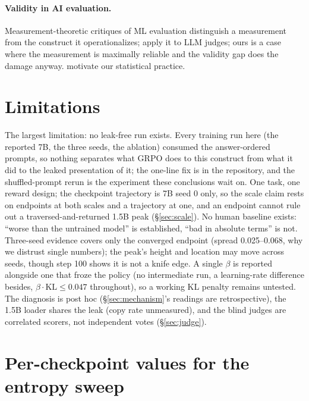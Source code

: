 \documentclass{article}
\begin{document}
\paragraph{Validity in AI evaluation.} Measurement-theoretic critiques of
ML evaluation \citep{jacobs2021, freiesleben2025} distinguish a measurement
from the construct it operationalizes; \citet{chehbouni2025} apply it to LLM
judges; ours is a case where the measurement is maximally reliable and the
validity gap does the damage anyway. \citet{agarwal2021} motivate our
statistical practice.

\section{Limitations}
\label{sec:limitations}

The largest limitation: no leak-free run exists. Every training run here
(the reported 7B, the three seeds, the ablation) consumed the
answer-ordered prompts, so nothing separates what GRPO does to this
construct from what it did to the leaked presentation of it; the one-line fix is in the repository, and the shuffled-prompt
rerun is the experiment these conclusions wait on. One task, one reward design; the
checkpoint trajectory is 7B seed 0 only, so the scale claim rests on
endpoints at both scales and a trajectory at one, and an endpoint cannot
rule out a traversed-and-returned 1.5B peak (\S\ref{sec:scale}). No human baseline exists: ``worse than the untrained model'' is
established, ``bad in absolute terms'' is not. Three-seed evidence covers only the converged endpoint (spread
0.025--0.068, why we distrust single numbers); the peak's height and
location may move across seeds, though step 100 shows it is not a knife
edge. A single $\beta$ is reported alongside one that froze the policy (no
intermediate run, a learning-rate difference besides, $\beta \cdot
\mathrm{KL} \le 0.047$ throughout), so a working KL penalty remains
untested. The diagnosis is post hoc
(\S\ref{sec:mechanism}'s readings are retrospective), the 1.5B loader
shares the leak (copy rate unmeasured), and the blind judges are
correlated scorers, not independent votes (\S\ref{sec:judge}).




\appendix

\section{Per-checkpoint values for the entropy sweep}
\label{app:ckpt}
\end{document}
